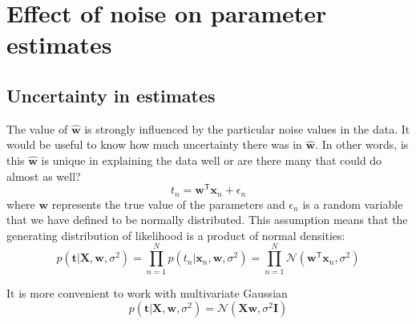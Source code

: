 \documentclass[a4paper,11pt]{article} %
\begin{document}
\section{Effect of noise on parameter estimates}

\subsection{Uncertainty in estimates}

The value of $\widehat{\mathbf{w}}$ is strongly influenced by the particular noise values in the data.
It would be useful to know how much uncertainty there was in $\widehat{\mathbf{w}}$.
In other words, is this $\widehat{\mathbf{w}}$ is unique in explaining the data well or are there
many that could do almost as well?
\begin{equation}
t_{n} = \mathbf{w}^{\mathsf{T}}\mathbf{x}_{n} + \epsilon_{n}
\end{equation}
where $\mathbf{w}$ represents the true value of the parameters and $\epsilon_n$ is a random
variable that we have defined to be normally distributed. This assumption means that the
generating distribution of likelihood is a product of normal densities:
\begin{equation}
p(\mathbf{t}|\mathbf{X},\mathbf{w},\sigma^2) =
\prod_{n=1}^{N} p(t_{n} | \mathbf{x}_{n},\mathbf{w},\sigma^2) =
\prod_{n=1}^{N} \mathcal{N}(\mathbf{w}^{\mathsf{T}}\mathbf{x}_{n},\sigma^2)
\end{equation}

It is more convenient to work with multivariate Gaussian
\begin{equation}
p(\mathbf{t}|\mathbf{X},\mathbf{w},\sigma^2) = \mathcal{N}(\mathbf{X}\mathbf{w},\sigma^2\mathbf{I})
\end{equation}
\end{document}
